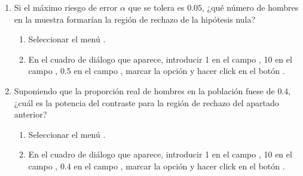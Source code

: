 \begin{enumerate}[leftmargin=*]
\begin{enumerate}
\item Si el máximo riesgo de error $\alpha$ que se tolera es $0.05$, ¿qué número de hombres en la muestra formarían la
región de rechazo de la hipótesis nula?
\begin{indicacion}{
\begin{enumerate}
\item Seleccionar el menú .
\item En el cuadro de diálogo que aparece, introducir 1 en el campo , 10 en el campo
, $0.5$ en el campo , marcar la opción  y
hacer click en el botón .
\end{enumerate}}
\end{indicacion}

\item Suponiendo que la proporción real de hombres en la población fuese de $0.4$, ¿cuál es la potencia del contraste
para la región de rechazo del apartado anterior?
\begin{indicacion}{
\begin{enumerate}
\item Seleccionar el menú .
\item En el cuadro de diálogo que aparece, introducir 1 en el campo , 10 en el campo
, $0.4$ en el campo , marcar la opción  y
hacer click en el botón .
\end{enumerate}}
\end{indicacion}


\end{enumerate}
\end{enumerate}
